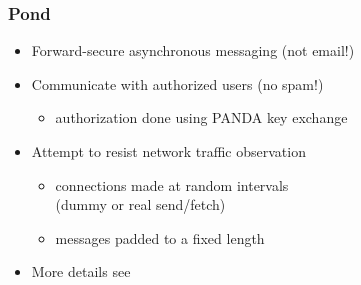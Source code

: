 \begin{frame}
	\frametitle{Pond}

	\begin{itemize}
	\setlength\itemsep{1em}
	\item	Forward-secure asynchronous messaging (not email!)
	\item	Communicate with authorized users (no spam!)
		\begin{itemize}
		\item	authorization done using PANDA key exchange
		\end{itemize}
	\item	Attempt to resist network traffic observation
		\begin{itemize}
		\item	connections made at random intervals\\
			(dummy or real send/fetch)
		\item	messages padded to a fixed length
		\end{itemize}
	\item	More details see \\
		{}
	\end{itemize}

\end{frame}

